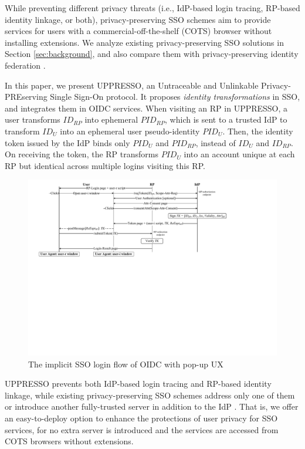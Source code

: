 While preventing different privacy threats (i.e., IdP-based login tracing, RP-based identity linkage, or both),
privacy-preserving SSO schemes \cite{maler2008venn, NIST2017draft, BrowserID, save-flow, SPRESSO,miso,POIDC} aim to provide services for users with a commercial-off-the-shelf (COTS) browser without installing extensions.
We analyze existing privacy-preserving SSO solutions in Section \ref{sec:background},
    and also compare them with privacy-preserving identity federation \cite{PseudoID, ELPASSO, UnlimitID, Opaak, uprov, hyperledge-idemix}.

In this paper, we present UPPRESSO, an Untraceable and Unlinkable Privacy-PREserving Single Sign-On protocol.
It proposes {\em identity transformations} in SSO,
 and integrates them in OIDC services.
When visiting an RP in UPPRESSO, a user transforms $ID_{RP}$ into ephemeral $PID_{RP}$, which is sent to a trusted IdP to transform $ID_U$ into an ephemeral user pseudo-identity $PID_U$.
Then, the identity token issued by the IdP binds only $PID_U$ and $PID_{RP}$, instead of $ID_U$ and $ID_{RP}$. On receiving the token, %
 the RP transforms $PID_U$ into an account unique at each RP but identical across multiple logins visiting this RP.


\begin{figure}[tb]
  \centering
  \includegraphics[width=0.8\linewidth]{fig/OIDC-pop.pdf}
  \caption{The implicit SSO login flow of OIDC with pop-up UX}
  \label{fig:OpenID}
\end{figure}

UPPRESSO prevents both IdP-based login tracing and RP-based identity linkage, while existing privacy-preserving SSO schemes address only one of them \cite{BrowserID, SPRESSO, NIST2017draft, save-flow,POIDC} or introduce another fully-trusted server in addition to the IdP \cite{miso,SPRESSO}.
That is, we offer an easy-to-deploy option to enhance the protections of user privacy for SSO services, for no extra server is introduced and the services are accessed from COTS browsers without extensions.

